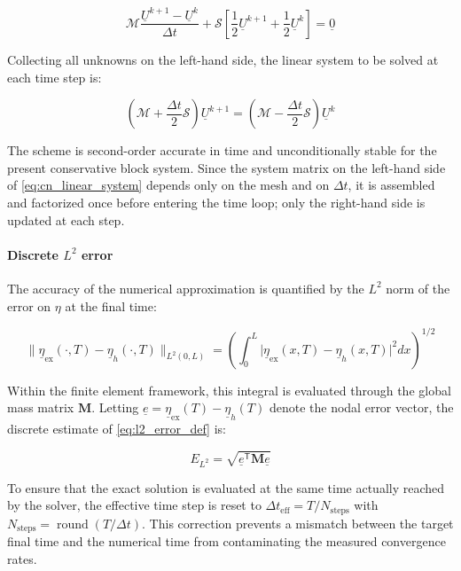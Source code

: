 \begin{equation}
\mathcal{M} \frac{\underline{U}^{k+1}-\underline{U}^{k}}{\Delta t}
+
\mathcal{S}
\left[\frac{1}{2}\underline{U}^{k+1}+\frac{1}{2}\underline{U}^{k}\right]
= \underline{0}
\label{eq:cn_scheme}
\end{equation}

Collecting all unknowns on the left-hand side, the linear system to be solved at each time step is:

\begin{equation}
\left(\mathcal{M} + \frac{\Delta t}{2}\mathcal{S}\right)\underline{U}^{k+1}
=
\left(\mathcal{M} - \frac{\Delta t}{2}\mathcal{S}\right)\underline{U}^{k}
\label{eq:cn_linear_system}
\end{equation}

The scheme is second-order accurate in time and unconditionally stable for the present conservative block system. Since the system matrix on the left-hand side of \eqref{eq:cn_linear_system} depends only on the mesh and on \(\Delta t\), it is assembled and factorized once before entering the time loop; only the right-hand side is updated at each step.

\paragraph{Discrete \(L^2\) error}
The accuracy of the numerical approximation is quantified by the \(L^2\) norm of the error on \(\eta\) at the final time:

\begin{equation}
\|\underline{\eta}_{\mathrm{ex}}(\cdot,T) - \underline{\eta}_h(\cdot,T)\|_{L^2(0,L)}
=
\left(\int_0^L \bigl|\underline{\eta}_{\mathrm{ex}}(x,T)-\underline{\eta}_h(x,T)\bigr|^2  dx\right)^{1/2}
\label{eq:l2_error_def}
\end{equation}

Within the finite element framework, this integral is evaluated through the global mass matrix \(\mathbf{M}\). Letting \(\underline{e} = \underline{\eta}_{\mathrm{ex}}(T) - \underline{\eta}_h(T)\) denote the nodal error vector, the discrete estimate of \eqref{eq:l2_error_def} is:

\begin{equation}
E_{L^2} = \sqrt{\underline{e}^{\mathsf{T}}\mathbf{M} \underline{e}}
\label{eq:discrete_l2}
\end{equation}

To ensure that the exact solution is evaluated at the same time actually reached by the solver, the effective time step is reset to \(\Delta t_{\mathrm{eff}} = T / N_{\mathrm{steps}}\) with \(N_{\mathrm{steps}} = \operatorname{round}(T/\Delta t)\). This correction prevents a mismatch between the target final time and the numerical time from contaminating the measured convergence rates.

